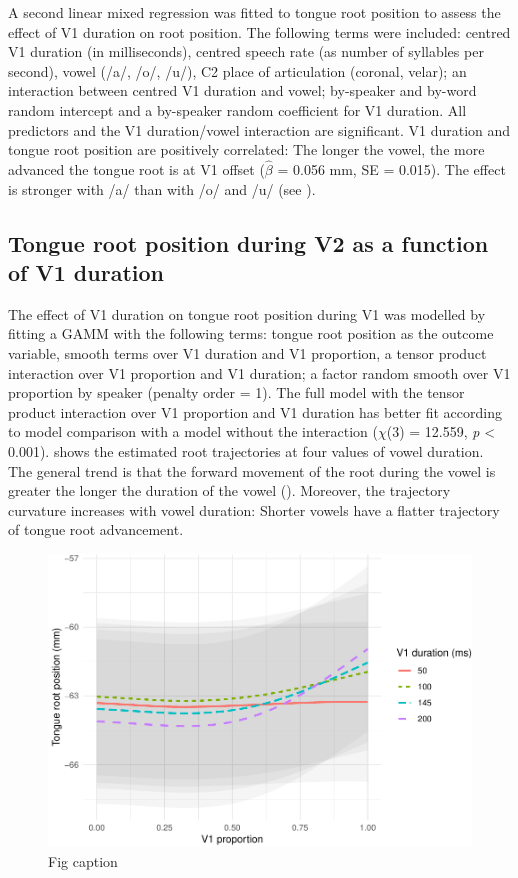 \documentclass[12pt,]{article}
\begin{document}
A second linear mixed regression was fitted to tongue root position to
assess the effect of V1 duration on root position. The following terms
were included: centred V1 duration (in milliseconds), centred speech
rate (as number of syllables per second), vowel (/a/, /o/, /u/), C2
place of articulation (coronal, velar); an interaction between centred
V1 duration and vowel; by-speaker and by-word random intercept and a
by-speaker random coefficient for V1 duration. All predictors and the V1
duration/vowel interaction are significant. V1 duration and tongue root
position are positively correlated: The longer the vowel, the more
advanced the tongue root is at V1 offset (\(\hat{\beta}\) = 0.056 mm, SE
= 0.015). The effect is stronger with /a/ than with /o/ and /u/ (see
).

\hypertarget{tongue-root-position-during-v2-as-a-function-of-v1-duration}{%
\subsection{Tongue root position during V2 as a function of V1
duration}\label{tongue-root-position-during-v2-as-a-function-of-v1-duration}}

The effect of V1 duration on tongue root position during V1 was modelled
by fitting a GAMM with the following terms: tongue root position as the
outcome variable, smooth terms over V1 duration and V1 proportion, a
tensor product interaction over V1 proportion and V1 duration; a factor
random smooth over V1 proportion by speaker (penalty order = 1). The
full model with the tensor product interaction over V1 proportion and V1
duration has better fit according to model comparison with a model
without the interaction (\(\chi\)(3) = 12.559, \emph{p} \textless{}
0.001).  shows the estimated root trajectories at
four values of vowel duration. The general trend is that the forward
movement of the root during the vowel is greater the longer the duration
of the vowel (). Moreover, the trajectory
curvature increases with vowel duration: Shorter vowels have a flatter
trajectory of tongue root advancement.

\begin{figure}
\includegraphics[width=\linewidth]{2018-tra_files/figure-latex/tra-gam-2-plot-1} \caption{Fig caption}\label{f:tra-gam-2-plot}
\end{figure}
\end{document}
